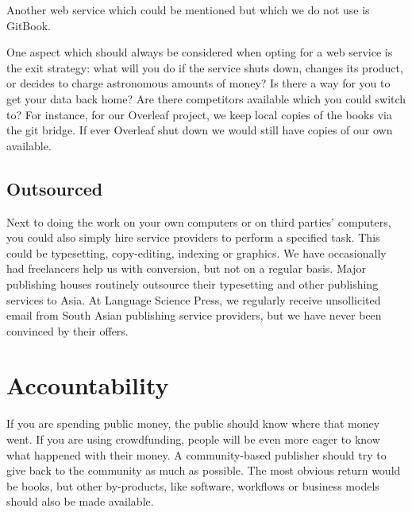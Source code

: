 \documentclass[guidelines,nonflat,modfonts] {langsci/langscibook}
\begin{document}
Another web service which could be mentioned but which we do not use is GitBook. 

One aspect which should always be considered when opting for a web service is the exit strategy: what will you do if the service shuts down, changes its product, or decides to charge astronomous amounts of money? Is there a way for you to get your data back home? Are there competitors available which you could switch to? For instance, for our Overleaf project, we keep local copies of the books via the git bridge. If ever Overleaf shut down we would still have copies of our own available. 

\subsection{Outsourced}
Next to doing the work on your own computers or on third parties' computers, you could also simply hire service providers to perform a specified task. This could be typesetting, copy-editing, indexing or graphics. We have occasionally had freelancers help us with conversion, but not on a regular basis. Major publishing houses routinely outsource their typesetting and other publishing services to Asia. At Language Science Press, we regularly receive unsollicited email from South Asian publishing service providers, but we have never been convinced by their offers. 
            
            
\section{Accountability}
If you are spending public money, the public should know where that money went. If you are using crowdfunding, people will be even more eager to know what happened with their money. A community-based publisher should try to give back to the community as much as possible. The most obvious return would be books, but other by-products, like software, workflows or business models should also be made available. 
\end{document}

